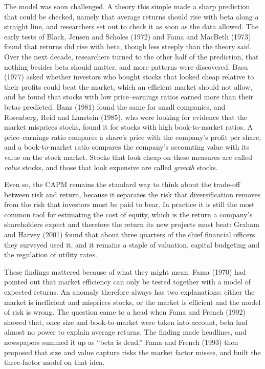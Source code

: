 The model was soon challenged. A theory this simple made a sharp prediction that could be checked, namely that average returns should rise with beta along a straight line, and researchers set out to check it as soon as the data allowed. The early tests of Black, Jensen and Scholes (1972) and Fama and MacBeth (1973) found that returns did rise with beta, though less steeply than the theory said. Over the next decade, researchers turned to the other half of the prediction, that nothing besides beta should matter, and more patterns were discovered.
Basu (1977) asked whether investors who bought stocks that looked cheap relative to their profits could beat the market, which an efficient market should not allow, and he found that stocks with low price--earnings ratios earned more than their betas predicted. Banz (1981) found the same for small companies, and Rosenberg, Reid and Lanstein (1985), who were looking for evidence that the market misprices stocks, found it for stocks with high book-to-market ratios. A price--earnings ratio compares a share's price with the company's profit per share, and a book-to-market ratio compares the company's accounting value with its value on the stock market. Stocks that look cheap on these measures are called \emph{value} stocks, and those that look expensive are called \emph{growth} stocks.

Even so, the CAPM remains the standard way to think about the trade-off between risk and return, because it separates the risk that diversification removes from the risk that investors must be paid to bear. In practice it is still the most common tool for estimating the cost of equity, which is the return a company's shareholders expect and therefore the return its new projects must beat: Graham and Harvey (2001) found that about three quarters of the chief financial officers they surveyed used it, and it remains a staple of valuation, capital budgeting and the regulation of utility rates. 

These findings mattered because of what they might mean. 
Fama (1970) had pointed out that market efficiency can only be tested together with a model of expected returns. An anomaly therefore always has two explanations: either the market is inefficient and misprices stocks, or the market is efficient and the model of risk is wrong.
The question came to a head when Fama and French (1992) showed that, once size and book-to-market were taken into account, beta had almost no power to explain average returns. The finding made headlines, and newspapers summed it up as ``beta is dead.'' Fama and French (1993) then proposed that size and value capture risks the market factor misses, and built the three-factor model on that idea. 

